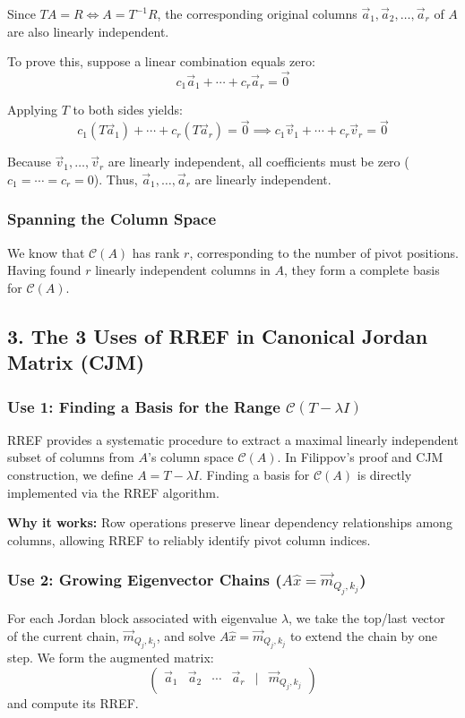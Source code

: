 \documentclass[12pt, a4paper]{article}
\begin{document}
Since $T A = R \iff A = T^{-1} R$, the corresponding original columns $\vec{a}_1, \vec{a}_2, \dots, \vec{a}_r$ of $A$ are also linearly independent. 

To prove this, suppose a linear combination equals zero:
\[
c_1 \vec{a}_1 + \cdots + c_r \vec{a}_r = \vec{0}
\]

Applying $T$ to both sides yields:
\[
c_1 (T \vec{a}_1) + \cdots + c_r (T \vec{a}_r) = \vec{0} \implies c_1 \vec{v}_1 + \cdots + c_r \vec{v}_r = \vec{0}
\]

Because $\vec{v}_1, \dots, \vec{v}_r$ are linearly independent, all coefficients must be zero ($c_1 = \cdots = c_r = 0$). Thus, $\vec{a}_1, \dots, \vec{a}_r$ are linearly independent.

\subsubsection*{Spanning the Column Space}
We know that $\mathcal{C}(A)$ has rank $r$, corresponding to the number of pivot positions. Having found $r$ linearly independent columns in $A$, they form a complete basis for $\mathcal{C}(A)$.

\subsection*{\color{accent} 3. The 3 Uses of RREF in Canonical Jordan Matrix (CJM)}

\subsubsection*{Use 1: Finding a Basis for the Range $\mathcal{C}(T - \lambda I)$}
RREF provides a systematic procedure to extract a maximal linearly independent subset of columns from $A$'s column space $\mathcal{C}(A)$. In Filippov's proof and CJM construction, we define $A = T - \lambda I$. Finding a basis for $\mathcal{C}(A)$ is directly implemented via the RREF algorithm.

\textbf{Why it works:} Row operations preserve linear dependency relationships among columns, allowing RREF to reliably identify pivot column indices.

\subsubsection*{Use 2: Growing Eigenvector Chains ($A\hat{x} = \vec{m}_{Q_j, k_j}$)}
For each Jordan block associated with eigenvalue $\lambda$, we take the top/last vector of the current chain, $\vec{m}_{Q_j, k_j}$, and solve $A\hat{x} = \vec{m}_{Q_j, k_j}$ to extend the chain by one step. We form the augmented matrix:
\[
\begin{pmatrix} \vec{a}_1 & \vec{a}_2 & \cdots & \vec{a}_r & \mid & \vec{m}_{Q_j, k_j} \end{pmatrix}
\]
and compute its RREF. 
\end{document}
